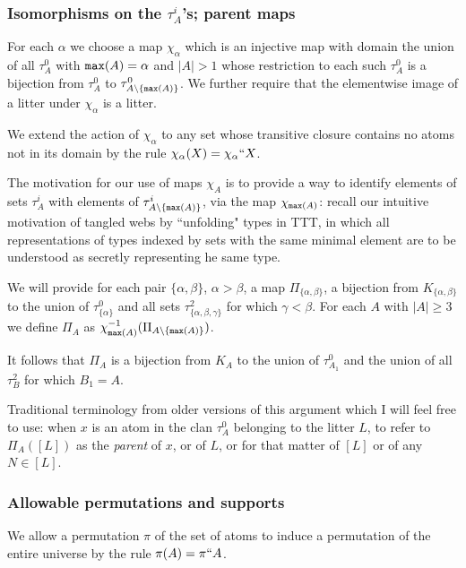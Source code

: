 \documentclass[12pt]{article}
\begin{document}
\subsubsection{Isomorphisms on the $\tau^i_A$'s;  parent maps}

For each $\alpha$ we choose a map $\chi_\alpha$ which is an injective map with domain the union of all $\tau^0_A$ with ${\tt max}(A)=\alpha$ and $|A|>1$ whose restriction
to each such $\tau^0_A$ is a bijection from $\tau^0_A$ to $\tau^0_{A\setminus \{{\tt max}(A)\}}$.  We further require that the elementwise image of a litter under $\chi_\alpha$ is a litter.



We extend the action of $\chi_\alpha$ to any set whose transitive closure contains no atoms not in its domain by the rule $\chi_\alpha(X) = \chi_\alpha``X$.

The motivation for our use of maps $\chi_A$ is to provide a way to identify elements of sets $\tau^i_A$ with elements of $\tau^i_{A \setminus \{{\tt max}(A)\}}$, via the
map $\chi_{{\tt max}(A)}$:  recall our intuitive motivation of tangled webs by ``unfolding" types in TTT, in which all representations of types indexed by sets with the same minimal element are to be understood as secretly representing he same type.

We will provide for each pair $\{\alpha,\beta\}$, $\alpha>\beta$, a map $\Pi_{\{\alpha,\beta\}}$, a bijection from $K_{\{\alpha,\beta\}}$ to the union of
$\tau^0_{\{\alpha\}}$ and all sets $\tau^2_{\{\alpha,\beta,\gamma\}}$ for which $\gamma<\beta$.  For each $A$ with $|A|\geq 3$ we define $\Pi_A$ as $\chi_{{\tt max}(A)}^{-1}(\Pi_{A \setminus \{{\tt max}(A)\}})$. 

 It follows that $\Pi_A$ is a bijection from $K_A$ to the union of $\tau^0_{A_1}$ and the union of all $\tau^2_B$ for which $B_1=A$.

Traditional terminology from older versions of this argument which I will feel free to use:   when $x$ is an atom in the clan $\tau^0_A$ belonging to the litter $L$, to refer to $\Pi_A([L])$ as the {\em parent\/} of $x$, or of $L$, or for that matter of $[L]$ or of any $N \in [L]$.

\newpage

\subsubsection{Allowable permutations and supports}

We allow a permutation $\pi$ of the set of atoms to induce a permutation of the entire universe by the rule $\pi(A) =\pi``A$.
\end{document}
